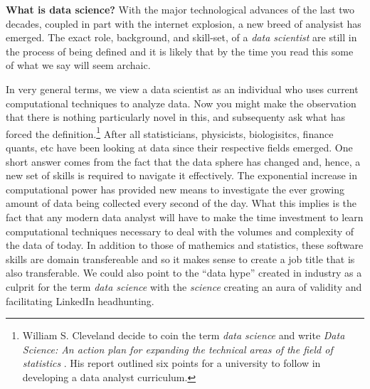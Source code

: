 \textbf{What is data science?}
With the major technological advances of the last two decades, coupled in part with the internet explosion, a new breed of analysist has emerged. The exact role, background, and skill-set, of a 
\emph{data scientist} are still in the process of being defined and it is likely that by the time you read this some of what we say will seem archaic. 

In very general terms, we view a data scientist as an individual who uses current computational techniques to analyze data.  Now you might make the observation that there is nothing particularly novel 
in this, and subsequenty ask what has forced the definition.\footnote{William S. Cleveland decide to coin the term \emph{data science} and write  \emph{Data Science: An action plan for expanding the technical areas of the field of statistics} \cite{ClevelandData}.  His report outlined six points for a university to follow in developing a data analyst curriculum.}  After all statisticians, physicists, biologisitcs, finance quants, etc have been looking at data since their respective fields 
emerged. 
One short answer comes from the fact that the data sphere has changed and, hence, a new set of skills is 
required to navigate it effectively. The exponential increase in computational power has provided new means to investigate the ever growing amount of data being collected every second of the
day. What this implies is the fact that any modern data analyst will have to make the time investment to learn computational techniques necessary to deal with the volumes and complexity of the data of today.
In addition to those of mathemics and statistics, these software skills are domain transfereable and so it makes sense to create a job title that is also transferable.  We could also point to the ``data hype'' created in industry as a culprit for the term \emph{data science} with the \emph{science} creating an aura of validity and facilitating LinkedIn headhunting.

